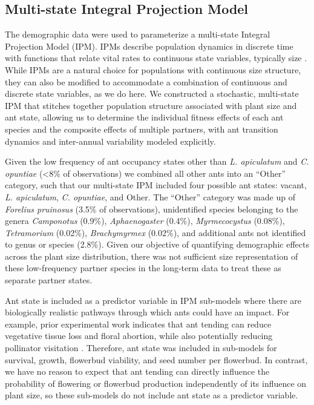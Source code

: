 \documentclass[11pt]{article}
\begin{document}
\subsection*{Multi-state Integral Projection Model}
The demographic data were used to parameterize a multi-state Integral Projection Model (IPM).
IPMs describe population dynamics in discrete time with functions that relate vital rates to continuous state variables, typically size \citep{ellnerbook}. 
While IPMs are a natural choice for populations with continuous size structure, they can also be modified to accommodate a combination of continuous and discrete state variables, as we do here. 
We constructed a stochastic, multi-state IPM that stitches together population structure associated with plant size and ant state, allowing us to determine the individual fitness effects of each ant species and the composite effects of multiple partners, with ant transition dynamics and inter-annual variability modeled explicitly. 

Given the low frequency of ant occupancy states other than \textit{L. apiculatum} and \textit{C. opuntiae} (\textless8\% of observations) we combined all other ants into an ``Other'' category, such that our multi-state IPM included four possible ant states: vacant, \textit{L. apiculatum}, \textit{C. opuntiae}, and Other. 
The ``Other'' category was made up of \textit{Forelius pruinosus} (3.5\% of observations), unidentified species belonging to the genera \textit{Camponotus} (0.9\%), \textit{Aphaenogaster} (0.4\%), \textit{Myrmecocystus} (0.08\%), \textit{Tetramorium} (0.02\%), \textit{Brachymyrmex} (0.02\%), and additional ants not identified to genus or species (2.8\%). 
Given our objective of quantifying demographic effects across the plant size distribution, there was not sufficient size representation of these low-frequency partner species in the long-term data to treat these as separate partner states.  

Ant state is included as a predictor variable in IPM sub-models where there are biologically realistic pathways through which ants could have an impact. 
For example, prior experimental work indicates that ant tending can reduce vegetative tissue loss and floral abortion, while also potentially reducing pollinator visitation \citep{Miller2009,Ohm2014}. 
Therefore, ant state was included in sub-models for survival, growth, flowerbud viability, and seed number per flowerbud. 
In contrast, we have no reason to expect that ant tending can directly influence the probability of flowering or flowerbud production independently of its influence on plant size, so these sub-models do not include ant state as a predictor variable. 
\end{document}
